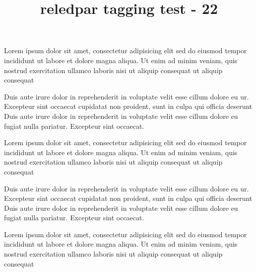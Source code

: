 \documentclass{article}
\title{reledpar tagging test - 22}
\begin{document}
\tableofcontents


\begin{pages}

\begin{Leftside}
\beginnumbering

Lorem ipsum dolor sit amet, consectetur adipisicing elit
sed do eiusmod tempor incididunt ut labore et dolore
magna aliqua. Ut enim ad minim veniam, quis nostrud
exercitation ullamco laboris nisi
ut aliquip  consequat ut aliquip consequat
\pend

Duis aute irure dolor in reprehenderit
in voluptate velit esse cillum dolore eu ur. Excepteur sint occaecat
cupidatat non proident, sunt in culpa qui officia deserunt
Duis aute irure dolor in reprehenderit
in voluptate velit esse cillum dolore eu fugiat nulla
pariatur. Excepteur sint occaecat.
\pend

Lorem ipsum dolor sit amet, consectetur adipisicing elit
sed do eiusmod tempor incididunt ut labore et dolore
magna aliqua. Ut enim ad minim veniam, quis nostrud
exercitation ullamco laboris nisi
ut aliquip consequat ut aliquip consequat\pend

Duis aute irure dolor in reprehenderit
in voluptate velit esse cillum dolore eu ur. Excepteur sint occaecat
cupidatat non proident, sunt in culpa qui officia deserunt
Duis aute irure dolor in reprehenderit
in voluptate velit esse cillum dolore eu fugiat nulla
pariatur. Excepteur sint occaecat.
\pend

Lorem ipsum dolor sit amet, consectetur adipisicing elit
sed do eiusmod tempor incididunt ut labore et dolore
magna aliqua. Ut enim ad minim veniam, quis nostrud
exercitation ullamco laboris nisi
ut aliquip consequat ut aliquip consequat
\pend


\end{Leftside}
\end{pages}
\end{document}
